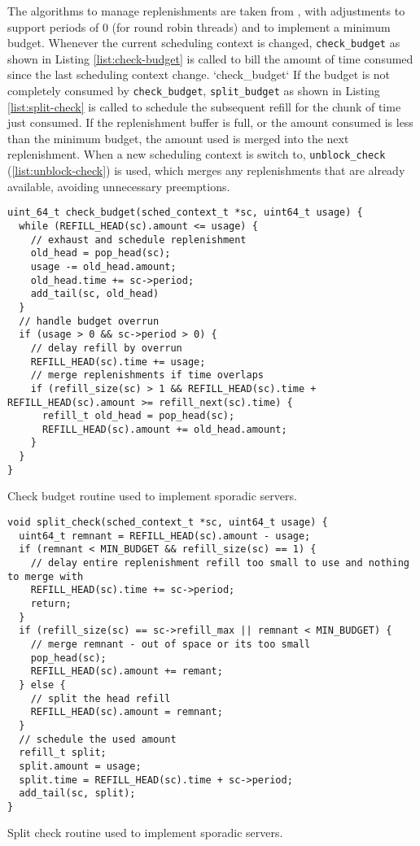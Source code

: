 The algorithms to manage replenishments are taken from \citet{Danish_LW_11}, with adjustments to
support periods of 0 (for round robin threads) and to implement a minimum budget.  Whenever the
current scheduling context is changed, \texttt{check\_budget} as shown in Listing
\ref{list:check-budget} is called to bill the amount of time consumed since the last scheduling
context change.  `check\_budget` If the budget is not completely consumed by \texttt{check\_budget},
\texttt{split\_budget} as shown in Listing \ref{list:split-check} is called to schedule the
subsequent refill for the chunk of time just consumed.  If the replenishment buffer is full, or the
amount consumed is less than the minimum budget, the amount used is merged into the next
replenishment.  When a new scheduling context is switch to, \texttt{unblock\_check} 
(\ref{list:unblock-check}) is used, which merges any replenishments that are already available,
avoiding unnecessary preemptions.

\begin{listing}[h]
\begin{verbatim}
uint_64_t check_budget(sched_context_t *sc, uint64_t usage) {
  while (REFILL_HEAD(sc).amount <= usage) {
    // exhaust and schedule replenishment
    old_head = pop_head(sc);
    usage -= old_head.amount;
    old_head.time += sc->period;
    add_tail(sc, old_head)
  }
  // handle budget overrun
  if (usage > 0 && sc->period > 0) {
    // delay refill by overrun
    REFILL_HEAD(sc).time += usage;
    // merge replenishments if time overlaps
    if (refill_size(sc) > 1 && REFILL_HEAD(sc).time + REFILL_HEAD(sc).amount >= refill_next(sc).time) {
      refill_t old_head = pop_head(sc);
      REFILL_HEAD(sc).amount += old_head.amount;
    }
  }
}
\end{verbatim}
\caption{Check budget routine used to implement sporadic servers.}
\label{list:check-budget}
\end{listing}

\begin{listing}[h]
\begin{verbatim}
void split_check(sched_context_t *sc, uint64_t usage) {
  uint64_t remnant = REFILL_HEAD(sc).amount - usage;
  if (remnant < MIN_BUDGET && refill_size(sc) == 1) {
    // delay entire replenishment refill too small to use and nothing to merge with
    REFILL_HEAD(sc).time += sc->period;
    return;
  }
  if (refill_size(sc) == sc->refill_max || remnant < MIN_BUDGET) {
    // merge remnant - out of space or its too small
    pop_head(sc);
    REFILL_HEAD(sc).amount += remant;
  } else {
    // split the head refill
    REFILL_HEAD(sc).amount = remnant;
  }
  // schedule the used amount
  refill_t split;
  split.amount = usage;
  split.time = REFILL_HEAD(sc).time + sc->period;
  add_tail(sc, split);
}
\end{verbatim}
\caption{Split check routine used to implement sporadic servers.}
\label{list:split-check}
\end{listing}


